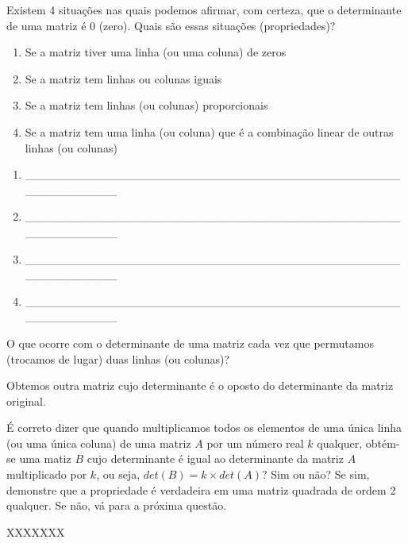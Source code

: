 \documentclass[pdftex, brazil, 12pt, oneside, addpoints]{exam}
\begin{document}
\begin{questions}
\question
Existem 4 situações nas quais podemos afirmar, com certeza, que o
determinante de uma matriz é 0 (zero). Quais são essas situações
(propriedades)?
\ifprintanswers
\begin{solution}
  \vspace{-0.7cm}
\begin{enumerate}
  \item Se a matriz tiver uma linha (ou uma coluna) de zeros
  \item Se a matriz tem linhas ou colunas iguais
  \item Se a matriz tem linhas (ou colunas) proporcionais
  \item Se a matriz tem uma linha (ou coluna) que é a combinação
    linear de outras linhas (ou colunas)
\end{enumerate}
\end{solution}
\else
\begin{enumerate}
  \item \_\_\_\_\_\_\_\_\_\_\_\_\_\_\_\_\_\_\_\_\_\_\_\_\_\_\_\_\_\_\_\_\_\_\_\_\_\_\_\_\_\_\_\_\_\_\_\_\_\_\_\_\_\_\_\_
  \item \_\_\_\_\_\_\_\_\_\_\_\_\_\_\_\_\_\_\_\_\_\_\_\_\_\_\_\_\_\_\_\_\_\_\_\_\_\_\_\_\_\_\_\_\_\_\_\_\_\_\_\_\_\_\_\_
  \item \_\_\_\_\_\_\_\_\_\_\_\_\_\_\_\_\_\_\_\_\_\_\_\_\_\_\_\_\_\_\_\_\_\_\_\_\_\_\_\_\_\_\_\_\_\_\_\_\_\_\_\_\_\_\_\_
  \item \_\_\_\_\_\_\_\_\_\_\_\_\_\_\_\_\_\_\_\_\_\_\_\_\_\_\_\_\_\_\_\_\_\_\_\_\_\_\_\_\_\_\_\_\_\_\_\_\_\_\_\_\_\_\_\_
\end{enumerate}
\fi

\question
O que ocorre com o determinante de uma matriz cada vez que permutamos
(trocamos de lugar) duas linhas (ou colunas)?
\begin{solutionorlines}[0.25in]
  Obtemos outra matriz cujo determinante é o oposto do determinante da
  matriz original.
\end{solutionorlines}

\question
É correto dizer que quando multiplicamos todos os elementos de uma
única linha (ou uma única coluna) de uma matriz $A$ por um número real $k$
qualquer, obtém-se uma matiz $B$ cujo determinante é igual ao
determinante da matriz $A$ multiplicado por $k$, ou seja, $det(B) = k
\times det(A)$? Sim ou não? Se sim, demonstre que a propriedade é
verdadeira em uma matriz quadrada de ordem 2 qualquer. Se não, vá para
a próxima questão.
\begin{solutionorbox}[1.0in]
  XXXXXXX
\end{solutionorbox}


\end{questions}
\end{document}
